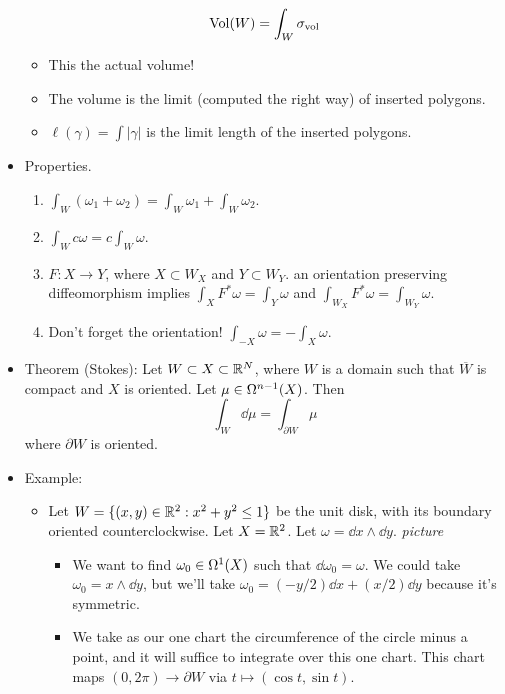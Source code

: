 \documentclass[../notes.tex]{subfiles}
\begin{document}
\begin{itemize}
    \begin{equation*}
        \Vol(W) = \int_W\sigma_\text{vol}
    \end{equation*}
    \begin{itemize}
        \item This the actual volume!
        \item The volume is the limit (computed the right way) of inserted polygons.
        \item $\ell(\gamma)=\int|\gamma|$ is the limit length of the inserted polygons.
    \end{itemize}
    \item Properties.
    \begin{enumerate}
        \item $\int_W(\omega_1+\omega_2)=\int_W\omega_1+\int_W\omega_2$.
        \item $\int_Wc\omega=c\int_W\omega$.
        \item $F:X\to Y$, where $X\subset W_X$ and $Y\subset W_Y$. an orientation preserving diffeomorphism implies $\int_XF^*\omega=\int_Y\omega$ and $\int_{W_X}F^*\omega=\int_{W_Y}\omega$.
        \item Don't forget the orientation! $\int_{-X}\omega=-\int_X\omega$.
    \end{enumerate}
    \item Theorem (Stokes): Let $W\subset X\subset\R^N$, where $W$ is a domain such that $\overline{W}$ is compact and $X$ is oriented. Let $\mu\in\ome[n-1]{X}$. Then
    \begin{equation*}
        \int_W\dd{\mu} = \int_{\partial W}\mu
    \end{equation*}
    where $\partial W$ is oriented.
    \item Example:
    \begin{itemize}
        \item Let $W=\{(x,y)\in\R^2:x^2+y^2\leq 1\}$ be the unit disk, with its boundary oriented counterclockwise. Let $X=\R^2$. Let $\omega=\dd{x}\wedge\dd{y}$.
        \emph{picture}
        \begin{itemize}
            \item We want to find $\omega_0\in\ome[1]{X}$ such that $\dd\omega_0=\omega$. We could take $\omega_0=x\wedge\dd{y}$, but we'll take $\omega_0=(-y/2)\dd{x}+(x/2)\dd{y}$ because it's symmetric.
            \item We take as our one chart the circumference of the circle minus a point, and it will suffice to integrate over this one chart. This chart maps $(0,2\pi)\to\partial W$ via $t\mapsto(\cos t,\sin t)$.

\end{itemize}
\end{itemize}
\end{itemize}
\end{document}
